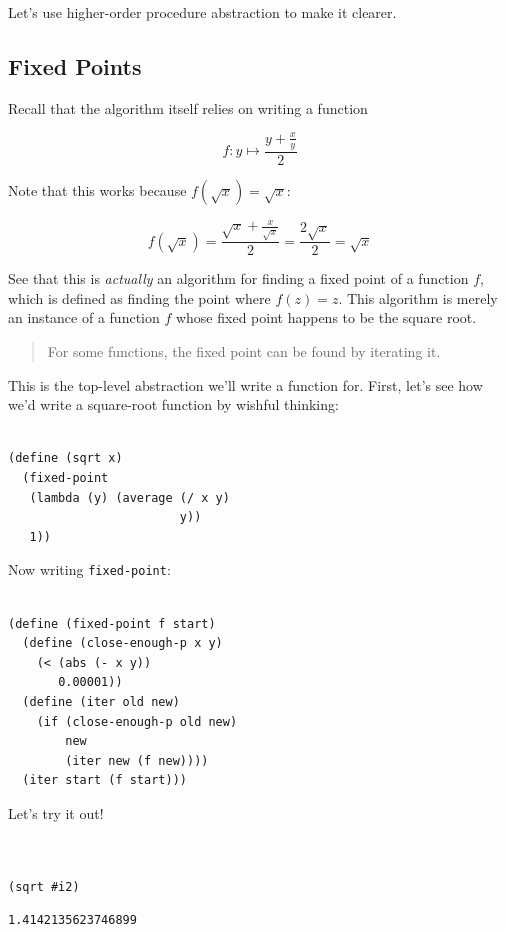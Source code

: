 \documentclass[9pt]{report}
\begin{document}
Let's use higher-order procedure abstraction to make it clearer.

\subsection{Fixed Points}
\label{sec:org4946bfe}

Recall that the algorithm itself relies on writing a function

$$f\colon y\mapsto \frac{y+\frac{x}{y}}{2}$$

Note that this works because \(f(\sqrt{x}) = \sqrt{x}\):

$$f(\sqrt{x})=\frac{\sqrt{x}+\frac{x}{\sqrt{x}}}{2} = \frac{2\sqrt{x}}{2} = \sqrt{x}$$

See that this is \emph{actually} an algorithm for finding a fixed point
of a function \(f\), which is defined as finding the point where
\(f(z)=z\). This algorithm is merely an instance of a function \(f\)
whose fixed point happens to be the square root.

\begin{quote}
For some functions, the fixed point can be found by iterating it.
\end{quote}

This is the top-level abstraction we'll write a function for.
First, let's see how we'd write a square-root function by wishful
thinking:

\begin{verbatim}

(define (sqrt x)
  (fixed-point
   (lambda (y) (average (/ x y)
                        y))
   1))
\end{verbatim}

Now writing \texttt{fixed-point}:

\begin{verbatim}

(define (fixed-point f start)
  (define (close-enough-p x y)
    (< (abs (- x y))
       0.00001))
  (define (iter old new)
    (if (close-enough-p old new)
        new
        (iter new (f new))))
  (iter start (f start)))
\end{verbatim}

Let's try it out!

\begin{verbatim}


(sqrt #i2)
\end{verbatim}

\begin{verbatim}
1.4142135623746899
\end{verbatim}
\end{document}
